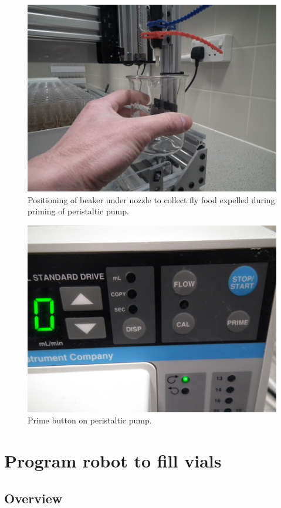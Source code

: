 \documentclass[]{book}
\theoremstyle{definition}
\theoremstyle{definition}
\theoremstyle{definition}
\theoremstyle{remark}
\begin{document}
\begin{figure}

{\centering \includegraphics[width=0.75\linewidth]{images/prime_beaker} 

}

\caption{Positioning of beaker under nozzle to collect fly food expelled during priming of peristaltic pump.}\label{fig:primeBeaker}
\end{figure}

\begin{figure}

{\centering \includegraphics[width=0.75\linewidth]{images/prime_button} 

}

\caption{Prime button on peristaltic pump.}\label{fig:primeButton}
\end{figure}

\chapter{Program robot to fill vials}\label{gcode}

\section{Overview}\label{overview-2}
\end{document}
